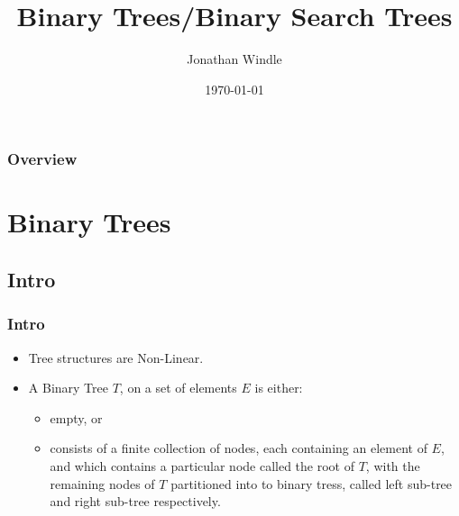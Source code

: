 \documentclass{beamer}
\title[Binary Trees/Binary Search Trees]{Binary Trees/Binary Search Trees} %
\author{Jonathan Windle} %
\institute[UEA] %
{
University of East Anglia \\ %
\medskip
\textit{J.Windle@uea.ac.uk} %
}
\date{\today} %
\begin{document}
\begin{frame}
\titlepage %
\end{frame}

\begin{frame}[allowframebreaks]
\frametitle{Overview} %
\tableofcontents %
\end{frame}

\section{Binary Trees}
\subsection{Intro}
\begin{frame}
\frametitle{Intro}
\begin{itemize}
\item Tree structures are {\color{green}Non-Linear}.
\item A {\color{red} Binary Tree} $T$, on a set of elements $E$ is either:
\begin{itemize}
\item empty, or
\item consists of a finite collection of nodes, each containing an element of $E$, and which contains a particular node called the {\color{purple} root} of $T$, with the remaining nodes of $T$ partitioned into to binary tress, called {\color{orange} left sub-tree} and {\color{magenta} right sub-tree} respectively.
\end{itemize}
\end{itemize}
\end{frame}
\end{document}

